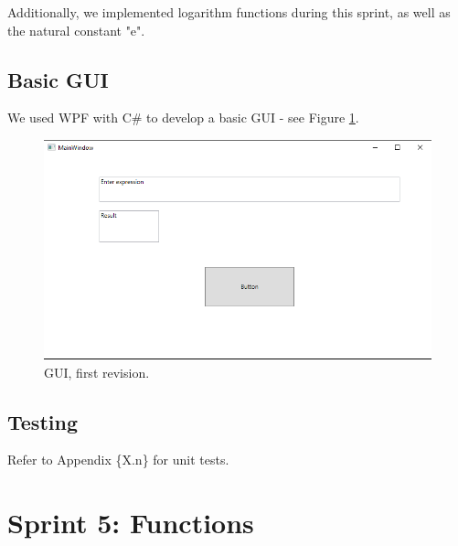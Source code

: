\documentclass[a4paper, oneside, 11pt]{report}
\begin{document}
    Additionally, we implemented logarithm functions during this sprint, as well as the natural constant "e".

    \subsection{Basic GUI}
    We used WPF with C\# to develop a basic GUI - see Figure \ref{gui01}.
    \begin{figure}[htb]
        \begin{center}

            \includegraphics[width=0.9 \columnwidth]{GUI_01}

            \caption{GUI, first revision.}
            \label{gui01}
        \end{center}
    \end{figure}

    \subsection{Testing}
    Refer to Appendix \{X.n\} for unit tests.

    \clearpage
    \section{Sprint 5: Functions}
\end{document}
